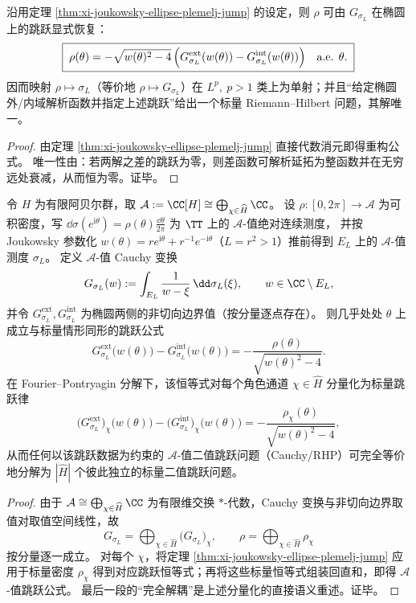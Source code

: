 

\begin{corollary}\label{cor:xi-joukowsky-ellipse-cauchy-inversion-rho}
沿用定理 \ref{thm:xi-joukowsky-ellipse-plemelj-jump} 的设定，则 \(\rho\) 可由 \(G_{\sigma_L}\) 在椭圆上的跳跃显式恢复：
\[
\boxed{\;
\rho(\theta)
=-\sqrt{w(\theta)^2-4}\,
\Bigl(G_{\sigma_L}^{\mathrm{ext}}(w(\theta))-G_{\sigma_L}^{\mathrm{int}}(w(\theta))\Bigr)
\quad\text{a.e. }\theta.\;}
\]
因而映射 \(\rho\mapsto \sigma_L\)（等价地 \(\rho\mapsto G_{\sigma_L}\)）在 \(L^p,\ p>1\) 类上为单射；并且“给定椭圆外/内域解析函数并指定上述跳跃”给出一个标量 Riemann--Hilbert 问题，其解唯一。
\end{corollary}
\begin{proof}
由定理 \ref{thm:xi-joukowsky-ellipse-plemelj-jump} 直接代数消元即得重构公式。
唯一性由：若两解之差的跳跃为零，则差函数可解析延拓为整函数并在无穷远处衰减，从而恒为零。证毕。
\end{proof}

\begin{theorem}\label{thm:xi-joukowsky-ellipse-jump-abelian-channel-decoupling}
令 \(H\) 为有限阿贝尔群，取 \(\mathcal{A}:=\CC[H]\cong\bigoplus_{\chi\in\widehat H}\CC\)。
设 \(\rho:[0,2\pi]\to\mathcal{A}\) 为可积密度，写 \(\dd\sigma(e^{\mathrm{i}\theta})=\rho(\theta)\frac{\dd\theta}{2\pi}\) 为 \(\TT\) 上的 \(\mathcal{A}\)-值绝对连续测度，
并按 Joukowsky 参数化 \(w(\theta)=r e^{\mathrm{i}\theta}+r^{-1}e^{-\mathrm{i}\theta}\)（\(L=r^2>1\)）推前得到 \(E_L\) 上的 \(\mathcal{A}\)-值测度 \(\sigma_L\)。
定义 \(\mathcal{A}\)-值 Cauchy 变换
\[
G_{\sigma_L}(w):=\int_{E_L}\frac{1}{w-\xi}\,\dd\sigma_L(\xi),\qquad w\in\CC\setminus E_L,
\]
并令 \(G^{\mathrm{ext}}_{\sigma_L},G^{\mathrm{int}}_{\sigma_L}\) 为椭圆两侧的非切向边界值（按分量逐点存在）。
则几乎处处 \(\theta\) 上成立与标量情形同形的跳跃公式
\[
\boxed{\;
G_{\sigma_L}^{\mathrm{ext}}\!\bigl(w(\theta)\bigr)-G_{\sigma_L}^{\mathrm{int}}\!\bigl(w(\theta)\bigr)
=-\frac{\rho(\theta)}{\sqrt{w(\theta)^2-4}}.\;}
\]
在 Fourier--Pontryagin 分解下，该恒等式对每个角色通道 \(\chi\in\widehat H\) 分量化为标量跳跃律
\[
\bigl(G_{\sigma_L}^{\mathrm{ext}}\bigr)_\chi\!\bigl(w(\theta)\bigr)-\bigl(G_{\sigma_L}^{\mathrm{int}}\bigr)_\chi\!\bigl(w(\theta)\bigr)
=-\frac{\rho_\chi(\theta)}{\sqrt{w(\theta)^2-4}},
\]
从而任何以该跳跃数据为约束的 \(\mathcal{A}\)-值二值跳跃问题（Cauchy/RHP）可完全等价地分解为 \(|\widehat H|\) 个彼此独立的标量二值跳跃问题。
\end{theorem}
\begin{proof}
由于 \(\mathcal{A}\cong\bigoplus_{\chi\in\widehat H}\CC\) 为有限维交换 \(\ast\)-代数，Cauchy 变换与非切向边界取值对取值空间线性，故
\[
G_{\sigma_L}=\bigoplus_{\chi\in\widehat H}\bigl(G_{\sigma_L}\bigr)_\chi,
\qquad
\rho=\bigoplus_{\chi\in\widehat H}\rho_\chi
\]
按分量逐一成立。
对每个 \(\chi\)，将定理 \ref{thm:xi-joukowsky-ellipse-plemelj-jump} 应用于标量密度 \(\rho_\chi\) 得到对应跳跃恒等式；再将这些标量恒等式组装回直和，即得 \(\mathcal{A}\)-值跳跃公式。
最后一段的“完全解耦”是上述分量化的直接语义重述。证毕。
\end{proof}

